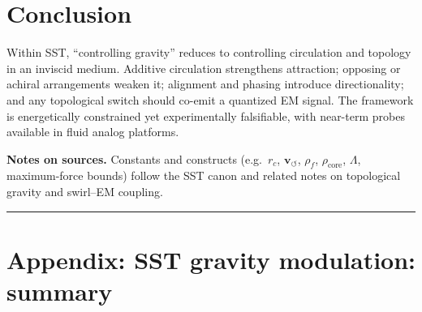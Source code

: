 \documentclass[11pt]{article}
\newcommand{\vcirc}{\mathbf{v}_{\scriptscriptstyle\boldsymbol{\circlearrowleft}}}
\newcommand{\rcore}{r_{\!c}}
\newcommand{\rhof}{\rho_{\!f}}
\newcommand{\rhocore}{\rho_{\text{core}}}
\newcommand{\LambdaS}{\Lambda}
\begin{document}
    \section{Conclusion}
        Within SST, ``controlling gravity'' reduces to controlling circulation and topology in an inviscid medium.
        Additive circulation strengthens attraction; opposing or achiral arrangements weaken it; alignment and phasing introduce directionality; and any topological switch should co-emit a quantized EM signal.
        The framework is energetically constrained yet experimentally falsifiable, with near-term probes available in fluid analog platforms.

        \bigskip
        \noindent\textbf{Notes on sources.} Constants and constructs (e.g.\ $\rcore$, $\vcirc$, $\rhof$, $\rhocore$, $\LambdaS$, maximum-force bounds) follow the SST canon and related notes on topological gravity and swirl–EM coupling.

        \bigskip
        \noindent\rule{\textwidth}{0.4pt}

        \appendix

        \newcommand{\rhoE}{\rho_{\!E}}
        \newcommand{\rhoM}{\rho_{\!m}}
        \newcommand{\vswirl}{\mathbf{v}_{\!\boldsymbol{\circlearrowleft}}}
        \newcommand{\vnorm}{\lVert \mathbf{v}_{\!\boldsymbol{\circlearrowleft}}\rVert}
        \newcommand{\rc}{r_c}

        \section{Appendix: SST gravity modulation: summary}
\end{document}
